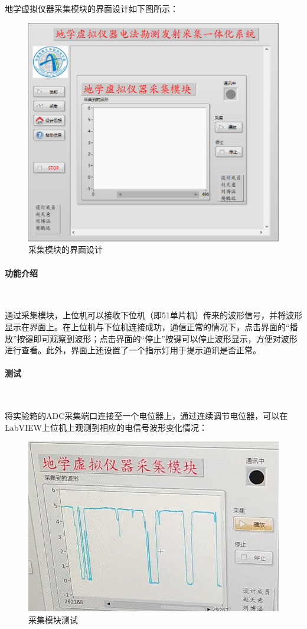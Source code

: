 \documentclass[UTF8]{article}
\begin{document}
地学虚拟仪器采集模块的界面设计如下图所示：
\begin{figure}[H]
    \centering %
    \includegraphics[width=.6\textwidth]{figure/采集界面.png} 
    \caption{采集模块的界面设计} %
\end{figure}

\paragraph{功能介绍}~{}

通过采集模块，上位机可以接收下位机（即51单片机）传来的波形信号，并将波形显示在界面上。在上位机与下位机连接成功，通信正常的情况下，点击界面的“播放”按键即可观察到波形；点击界面的“停止”按键可以停止波形显示，方便对波形进行查看。此外，界面上还设置了一个指示灯用于提示通讯是否正常。

\paragraph{测试}~{}

将实验箱的ADC采集端口连接至一个电位器上，通过连续调节电位器，可以在LabVIEW上位机上观测到相应的电信号波形变化情况：
\begin{figure}[H]
    \centering %
    \includegraphics[width=.6\textwidth]{figure/采集模块测试.png} 
    \caption{采集模块测试} %
\end{figure}
\end{document}
